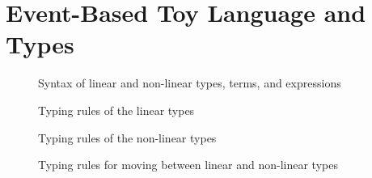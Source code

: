 \section{Event-Based Toy Language and Types}

\begin{figure}
    \centering
    
    \caption{Syntax of linear and non-linear types, terms, and expressions}
    \label{fig:syntax-of-types-terms-expressions}
\end{figure}

\begin{figure}
    \centering
    
    \caption{Typing rules of the linear types}
    \label{fig:typing-rules-for-linear-types}
\end{figure}

\begin{figure}
    \centering
    
    \caption{Typing rules of the non-linear types}
    \label{fig:typing-rules-for-nonlinear-types}
\end{figure}

\begin{figure}
    \centering
    
    \caption{Typing rules for moving between linear and non-linear types}
    \label{fig:typing-rules-for-linear-and-nonlinear-types}
\end{figure}